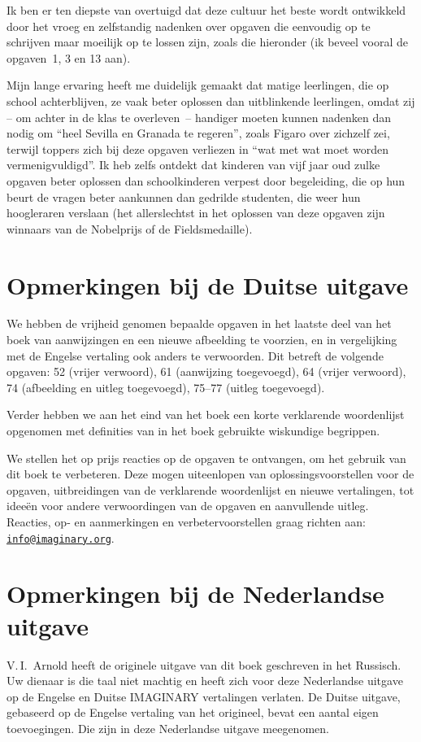 Ik ben er ten diepste van overtuigd dat deze cultuur het beste wordt ontwikkeld door het vroeg en zelfstandig nadenken over opgaven die eenvoudig op te schrijven maar moeilijk op te lossen zijn, zoals die hieronder (ik beveel vooral de opgaven~1, 3 en 13 aan).

Mijn lange ervaring heeft me duidelijk gemaakt dat matige leer\-lingen, die op school achterblijven, ze vaak beter oplossen dan uit\-blinkende leerlingen, omdat zij -- om achter in de klas te overleven~-- handiger moeten kunnen nadenken dan nodig om ``heel Sevilla en Granada te regeren'', zoals Figaro over zichzelf zei, terwijl toppers zich bij deze opgaven verliezen in ``wat met wat moet worden vermenig\-vuldigd''. Ik heb zelfs ontdekt dat kinderen van vijf jaar oud zulke opgaven beter oplossen dan schoolkinderen verpest door begeleiding, die op hun beurt de vragen beter aankunnen dan gedrilde studenten, die weer hun hoogleraren verslaan (het allerslechtst in het oplossen van deze opgaven zijn winnaars van de Nobelprijs of de Fieldsmedaille).

\clearpage

\section*{Opmerkingen bij de Duitse uitgave}
We hebben de vrijheid genomen bepaalde opgaven in het laatste deel van het boek van aanwijzingen en een nieuwe afbeelding te voorzien, en in vergelijking met de Engelse vertaling ook anders te verwoorden. Dit betreft de volgende opgaven: 52 (vrijer verwoord), 61 (aanwijzing toegevoegd), 64 (vrijer verwoord), 74 (afbeelding en uitleg toegevoegd), 75--77 (uitleg toegevoegd).

Verder hebben we aan het eind van het boek een korte verklarende woordenlijst opgenomen met definities van in het boek gebruikte wis\-kundige begrippen.

We stellen het op prijs reacties op de opgaven te ontvangen, om het gebruik van dit boek te verbeteren. Deze mogen uiteenlopen van oplossingsvoorstellen voor de opgaven, uitbreidingen van de verkla\-rende woordenlijst en nieuwe vertalingen, tot ideeën voor andere ver\-woordingen van de opgaven en aanvullende uitleg. Reacties, op- en aanmerkingen en verbetervoorstellen graag richten aan:\\\href{mailto:info@imaginary.org}{\nolinkurl{info@imaginary.org}}.

\section*{Opmerkingen bij de Nederlandse uitgave}
V.\,I.~Arnold heeft de originele uitgave van dit boek geschreven in het Russisch. Uw dienaar is die taal niet machtig en heeft zich voor deze Nederlandse uitgave op de Engelse en Duitse IMAGINARY vertalin\-gen verlaten. De Duitse uitgave, gebaseerd op de Engelse vertaling van het origineel, bevat een aantal eigen toevoegingen. Die zijn in deze Nederlandse uitgave meegenomen.

